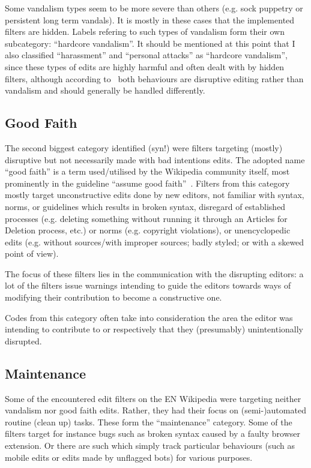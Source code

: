 Some vandalism types seem to be more severe than others (e.g. sock puppetry or persistent long term vandals).
It is mostly in these cases that the implemented filters are hidden.
Labels refering to such types of vandalism form their own subcategory: ``hardcore vandalism''. %
It should be mentioned at this point that I also classified ``harassment'' and ``personal attacks'' as ``hardcore vandalism'', since these types of edits are highly harmful and often dealt with by hidden filters, although according to~\cite{Wikipedia:Vandalism} both behaviours are disruptive editing rather than vandalism and should generally be handled differently.

\subsection{Good Faith}

The second biggest category identified (syn!) were filters targeting (mostly) disruptive but not necessarily made with bad intentions edits.
The adopted name ``good faith'' is a term used/utilised by the Wikipedia community itself, most prominently in the guideline ``assume good faith''~\cite{Wikipedia:GoodFaith}.
Filters from this category mostly target unconstructive edits done by new editors, not familiar with syntax, norms, or guidelines which results in broken syntax, disregard of established processes (e.g. deleting something without running it through an Articles for Deletion process, etc.) or norms (e.g. copyright violations),  or unencyclopedic edits (e.g. without sources/with improper sources; badly styled; or with a skewed point of view).

The focus of these filters lies in the communication with the disrupting editors:
a lot of the filters issue warnings intending to guide the editors towards ways of modifying their contribution to become a constructive one.

Codes from this category often take into consideration the area the editor was intending to contribute to or respectively that they (presumably) unintentionally disrupted.


\subsection{Maintenance}

Some of the encountered edit filters on the EN Wikipedia were targeting neither vandalism nor good faith edits.
Rather, they had their focus on (semi-)automated routine (clean up) tasks.
These form the ``maintenance'' category.
Some of the filters target for instance bugs such as broken syntax caused by a faulty browser extension.
Or there are such which simply track particular behaviours (such as mobile edits or edits made by unflagged bots) for various purposes.

